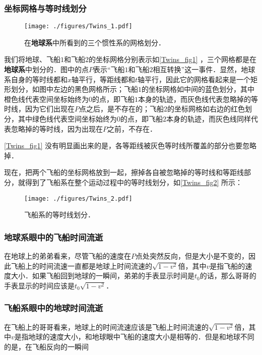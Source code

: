 \subsubsection{坐标网格与等时线划分}

\begin{figure}[ht]
\centering
\texttt{[image: ./figures/Twins\_1.pdf]}
\caption{在\textbf{地球系}中所看到的三个惯性系的网格划分．} \label{Twins_fig1}
\end{figure}

我们将地球、飞船$1$和飞船$2$的坐标网格分别表示如\autoref{Twins_fig1} ，三个网格都是在\textbf{地球系}中划分的．图中的点$P$表示“飞船$1$和飞船$2$相互转换”这一事件．显然，地球系自身的等时线都和$x$轴平行，等距线都和$t$轴平行，因此它的网格看起来是一个矩形划分，如图中左边的黑色网格所示；飞船$1$的坐标网格如中间的蓝色划分，其中橙色线代表空间坐标始终为$0$的点，即飞船$1$本身的轨迹，而灰色线代表忽略掉的等时线，因为它们出现在$P$点之后，是不存在的；飞船$2$的坐标网格如右边的红色划分，其中绿色线代表空间坐标始终为$0$的点，即飞船$2$本身的轨迹，而灰色线同样代表忽略掉的等时线，因为出现在$P$之前，不存在．

\autoref{Twins_fig1} 没有明显画出来的是，各等距线被灰色等时线所覆盖的部分也要忽略掉．

现在，把两个飞船的坐标网格放到一起，擦掉各自被忽略掉的等时线和等距线部分，就得到了飞船系在整个运动过程中的等时线划分，如\autoref{Twins_fig2} 所示：

\begin{figure}[ht]
\centering
\texttt{[image: ./figures/Twins\_2.pdf]}
\caption{飞船系的等时线划分．} \label{Twins_fig2}
\end{figure}

\subsubsection{地球系眼中的飞船时间流逝}

在地球上的弟弟看来，尽管飞船的速度在$P$点处突然反向，但是大小是不变的，因此飞船上的时间流速一直都是地球上时间流速的$\sqrt{1-v^2}$倍，其中$v$是指飞船的速度大小．如果飞船回到地球的一瞬间，弟弟的手表显示时间是$t_0$的话，那么哥哥的手表显示的时间应该是$t_0\sqrt{1-v^2}$．

\subsubsection{飞船系眼中的地球时间流逝}

在飞船上的哥哥看来，地球上的时间流速应该是飞船上时间流速的$\sqrt{1-v^2}$倍，其中$v$是指地球的速度大小，和地球眼中飞船的速度大小是相等的．但是和地球不同的是，在飞船反向的一瞬间









